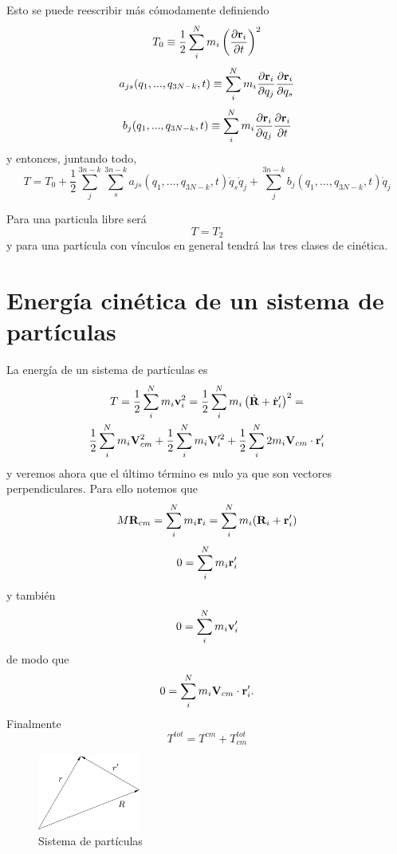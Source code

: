 \documentclass[10pt,oneside]{CBFT_book}
\begin{document}
Esto se puede reescribir más cómodamente definiendo
\[
	T_0 \equiv \frac{1}{2} \sum_i^N m_i \left( \dpar{\vb{r}_i}{t} \right)^2
\]
\[
	a_{js}(q_1,...,q_{3N-k},t) \equiv \sum_i^N  m_i \dpar{\vb{r}_i}{q_j}\dpar{\vb{r}_i}{q_s}
\]
\[
	b_j(q_1,...,q_{3N-k},t) \equiv \sum_i^N  m_i \dpar{\vb{r}_i}{q_j}\dpar{\vb{r}_i}{t}
\]
y entonces, juntando todo,
\[
	T = T_0 +
	\frac{1}{2} \sum_j^{3n-k}\sum_s^{3n-k}  a_{js}(q_1,...,q_{3N-k},t)\dot{q}_s\dot{q}_j  + 
	\sum_j^{3n-k} b_j(q_1,...,q_{3N-k},t)\dot{q}_j  
\]

Para una particula libre será
\[
	T = T_2
\]
y para una partícula con vínculos en general tendrá las tres clases de cinética.

\section{Energía cinética de un sistema de partículas}

La energía de un sistema de partículas es 
\begin{multline*}
	T = \frac{1}{2} \sum_i^N m_i \vb{v}_i^2 = 
	\frac{1}{2} \sum_i^N m_i \left( \dot{\vb{R}} + \dot{\vb{r}}_i' \right)^2 = \\
	\frac{1}{2} \sum_i^N m_i \vb{V}_{cm}^2  +
	\frac{1}{2} \sum_i^N m_i \vb{V}_i'^2 +
	\frac{1}{2} \sum_i^N 2 m_i \vb{V}_{cm} \cdot  \vb{r}_{i}' 
\end{multline*}
y veremos ahora que el último término es nulo ya que son vectores perpendiculares.
Para ello notemos que 
\[
	M \vb{R}_{cm} = \sum_i^N m_i \vb{r}_i = \sum_i^N m_i ( \vb{R}_i + \vb{r}_i' )
\]
\[
	0 = \sum_i^N m_i \vb{r}_i'
\]
y también 
\[
	0 = \sum_i^N m_i \vb{v}_i'
\]
de modo que 
\[
	0 = \sum_i^N m_i \vb{V}_{cm} \cdot \vb{r}_i'.
\]
Finalmente 
\[
	T^{tot} = T^{cm} + T_{cm}^{tot}
\]

\begin{figure}
	\begin{center}
	\includegraphics[width=0.3\textwidth]{images/fig_sist_part.pdf}	 
	\end{center}
	\caption{Sistema de partículas}
\end{figure} 
\end{document}
